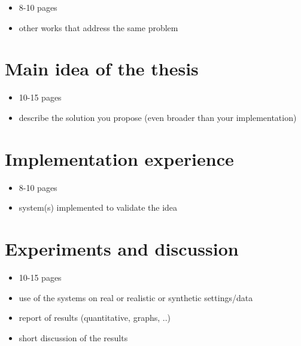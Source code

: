 \documentclass[11pt,a4paper]{article}
\begin{document}
\begin{itemize} 
    \item 8-10 pages
    \item other works that address the same problem 
\end{itemize}

\section{Main idea of the thesis}
\label{sec:main}

\begin{itemize} 
    \item 10-15 pages
    \item describe the solution you propose (even broader than your implementation)
\end{itemize}

\section{Implementation experience}
\label{sec:implementation}

\begin{itemize} 
    \item 8-10 pages
    \item system(s) implemented to validate the idea
\end{itemize}

\section{Experiments and discussion}
\label{sec:experiments}

\begin{itemize} 
    \item 10-15 pages
    \item use of the systems on real or realistic or synthetic settings/data
    \item report of results (quantitative, graphs, ..)
    \item short discussion of the results 
\end{itemize}
\end{document}

